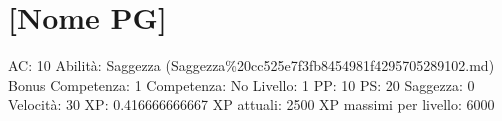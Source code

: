 \section{{[}Nome PG{]}}\label{nome-pg}

AC: 10 Abilità: Saggezza
(Saggezza\%20cc525e7f3fb8454981f4295705289102.md) Bonus Competenza: 1
Competenza: No Livello: 1 PP: 10 PS: 20 Saggezza: 0 Velocità: 30 XP:
0.416666666667 XP attuali: 2500 XP massimi per livello: 6000
